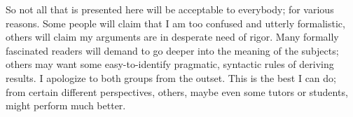 %

{So not all that is presented here} will be acceptable to everybody; for various reasons.
Some people will claim that I am too confused and utterly formalistic, others will claim my arguments are in desperate need of rigor.
Many formally fascinated readers will demand to go deeper into the meaning of the subjects;
others may want some easy-to-identify pragmatic, syntactic rules of deriving results.
I apologize to both groups from the outset.
This is the best I can do; from certain different perspectives, others, maybe even some tutors or students, might perform much better.


